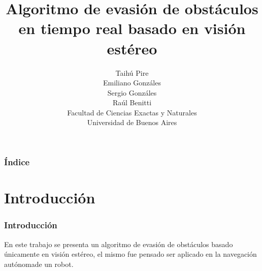 \documentclass[svgnames]{beamer}
\title[Evasi\'on de obst\'aculos basada en visi\'on est\'ereo]{Algoritmo de evasi\'on de obst\'aculos en tiempo real basado en visi\'on est\'ereo}
\author[T. Pire, E. Gonz\'ales, S. Gonz\'ales, R. Benitti]{{Taih\'u Pire\\ Emiliano Gonz\'ales\\ Sergio Gonz\'ales\\ Ra\'ul Benitti} \\ \vspace*{0.5cm} {\small Facultad de Ciencias Exactas y Naturales}\\ {\small Universidad de Buenos Aires}}
\date{}
\begin{document}
\frame{\titlepage}

\begin{frame}
\frametitle{\'Indice}
\tableofcontents%
\end{frame}

\section{Introducci\'on}

\begin{frame}
\frametitle{Introducci\'on}
En este trabajo se presenta un algoritmo de evasi\'on de obst\'aculos basado \'unicamente en visi\'on est\'ereo, el mismo fue pensado ser aplicado en la navegaci\'on aut\'onomade un robot.


\end{frame}
\end{document}
